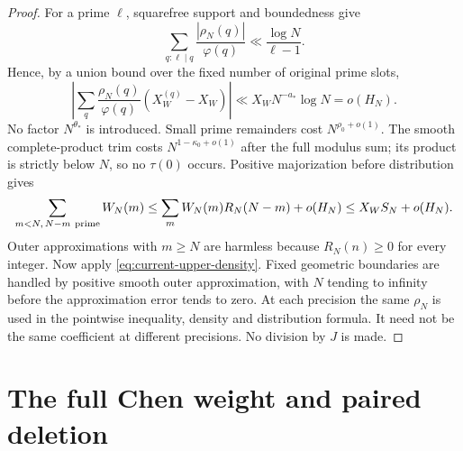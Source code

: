\begin{proof}
For a prime $\ell$, squarefree support and boundedness give
\[
 \sum_{q:\ell\mid q}\frac{|\rho_N(q)|}{\varphi(q)}
       \ll\frac{\log N}{\ell-1}.
\]
Hence, by a union bound over the fixed number of original prime slots,
\begin{equation}
 \left|\sum_q\frac{\rho_N(q)}{\varphi(q)}
                         (X_W^{(q)}-X_W)\right|
       \ll X_WN^{-a_*}\log N=o(H_N).
 \label{eq:current-coprime-correction}
\end{equation}
No factor $N^{\theta_*}$ is introduced.  Small prime remainders cost
$N^{\rho_0+o(1)}$.  The smooth complete-product trim costs
$N^{1-\kappa_0+o(1)}$ after the full modulus sum; its product is
strictly below $N$, so no $\tau(0)$ occurs.  Positive majorization
before distribution gives
\[
 \sum_{m<N,\,N-m\ {\rm prime}}W_N(m)
 \le\sum_m W_N(m)R_N(N-m)+o(H_N)
 \le X_WS_N+o(H_N).
\]
Outer approximations with $m\ge N$ are harmless because
$R_N(n)\ge0$ for every integer.  Now apply
\eqref{eq:current-upper-density}.  Fixed geometric boundaries are
handled by positive smooth outer approximation, with $N$ tending to
infinity before the approximation error tends to zero.  At each
precision the same $\rho_N$ is used in the pointwise inequality,
density and distribution formula.  It need not be the same
coefficient at different precisions.  No division by $J$ is made.
\end{proof}

\section{The full Chen weight and paired deletion}
\label{sec:current-chen-weight}

